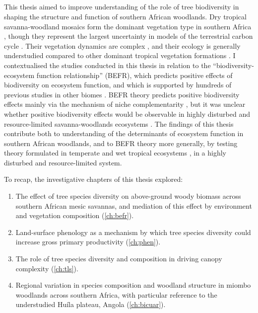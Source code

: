\begin{refsection}


\chapter{\chaptertitle}
\label{ch:discussion}

This thesis aimed to improve understanding of the role of tree biodiversity in shaping the structure and function of southern African woodlands. Dry tropical savanna-woodland mosaics form the dominant vegetation type in southern Africa \citep{}, though they represent the largest uncertainty in models of the terrestrial carbon cycle \citep{Ahlstrom2015}. Their vegetation dynamics are complex \citep{}, and their ecology is generally understudied compared to other dominant tropical vegetation formations \citep{}. I contextualised the studies conducted in this thesis in relation to the ``biodiversity-ecosystem function relationship'' (BEFR), which predicts positive effects of biodiversity on ecosystem function, and which is supported by hundreds of previous studies in other biomes \citep{Liang2016}. BEFR theory predicts positive biodiversity effects mainly via the mechanism of niche complementarity \citep{}, but it was unclear whether positive biodiversity effects would be observable in highly disturbed and resource-limited savanna-woodlands ecosystems \citep{}. The findings of this thesis contribute both to understanding of the determinants of ecosystem function in southern African woodlands, and to BEFR theory more generally, by testing theory formulated in temperate and wet tropical ecosystems \citep{}, in a highly disturbed and resource-limited system.

To recap, the investigative chapters of this thesis explored: 

\begin{enumerate}
	\item{The effect of tree species diversity on above-ground woody biomass across southern African mesic savannas, and mediation of this effect by environment and vegetation composition (\autoref{ch:befr}).}
	\item{Land-surface phenology as a mechanism by which tree species diversity could increase gross primary productivity (\autoref{ch:phen}).}
	\item{The role of tree species diversity and composition in driving canopy complexity (\autoref{ch:tls}).}
	\item{Regional variation in species composition and woodland structure in miombo woodlands across southern Africa, with particular reference to the understudied Hu\'{i}la plateau, Angola (\autoref{ch:bicuar}).}
\end{enumerate}


\end{refsection}
